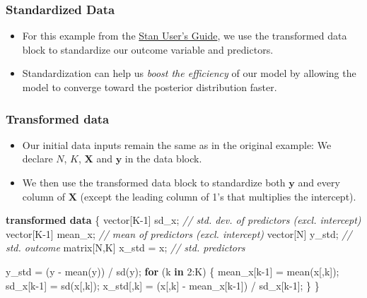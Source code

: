 \documentclass[
  11pt,
]{article}
\newenvironment{Shaded}{\begin{snugshade}}{\end{snugshade}}
\newcommand{\CommentTok}[1]{\textcolor[rgb]{0.56,0.35,0.01}{\textit{#1}}}
\newcommand{\ControlFlowTok}[1]{\textcolor[rgb]{0.13,0.29,0.53}{\textbf{#1}}}
\newcommand{\DataTypeTok}[1]{\textcolor[rgb]{0.13,0.29,0.53}{#1}}
\newcommand{\DecValTok}[1]{\textcolor[rgb]{0.00,0.00,0.81}{#1}}
\newcommand{\KeywordTok}[1]{\textcolor[rgb]{0.13,0.29,0.53}{\textbf{#1}}}
\newcommand{\NormalTok}[1]{#1}
\providecommand{\tightlist}{%
  \setlength{\itemsep}{0pt}\setlength{\parskip}{0pt}}
\begin{document}
\hypertarget{standardized-data}{%
\subsubsection{Standardized Data}\label{standardized-data}}

\begin{itemize}
\tightlist
\item
  For this example from the \href{https://mc-stan.org/docs/2_19/stan-users-guide/standardizing-predictors-and-outputs.html}{Stan User's Guide}, we use the transformed data block to standardize our outcome variable and predictors.
\item
  Standardization can help us \emph{boost the efficiency} of our model by allowing the model to converge toward the posterior distribution faster.
\end{itemize}

\hypertarget{transformed-data}{%
\subsubsection{Transformed data}\label{transformed-data}}

\begin{itemize}
\tightlist
\item
  Our initial data inputs remain the same as in the original example: We declare \(N\), \(K\), \(\mathbf{X}\) and \(\mathbf{y}\) in the data block.
\item
  We then use the transformed data block to standardize both \(\mathbf{y}\) and every column of \(\mathbf{X}\) (except the leading column of 1's that multiplies the intercept).
\end{itemize}

\begin{Shaded}
\begin{Highlighting}[]
\KeywordTok{transformed data}\NormalTok{ \{}
  \DataTypeTok{vector}\NormalTok{[K}\DecValTok{{-}1}\NormalTok{] sd\_x;       }\CommentTok{// std. dev. of predictors (excl. intercept)}
  \DataTypeTok{vector}\NormalTok{[K}\DecValTok{{-}1}\NormalTok{] mean\_x;     }\CommentTok{// mean of predictors (excl. intercept)}
  \DataTypeTok{vector}\NormalTok{[N] y\_std;        }\CommentTok{// std. outcome }
  \DataTypeTok{matrix}\NormalTok{[N,K] x\_std = x;  }\CommentTok{// std. predictors}
  
\NormalTok{  y\_std = (y {-} mean(y)) / sd(y);}
  \ControlFlowTok{for}\NormalTok{ (k }\ControlFlowTok{in} \DecValTok{2}\NormalTok{:K) \{}
\NormalTok{    mean\_x[k}\DecValTok{{-}1}\NormalTok{] = mean(x[,k]);}
\NormalTok{    sd\_x[k}\DecValTok{{-}1}\NormalTok{] = sd(x[,k]);}
\NormalTok{    x\_std[,k] = (x[,k] {-} mean\_x[k}\DecValTok{{-}1}\NormalTok{]) / sd\_x[k}\DecValTok{{-}1}\NormalTok{]; }
\NormalTok{  \}}
\NormalTok{\}}
\end{Highlighting}
\end{Shaded}
\end{document}
